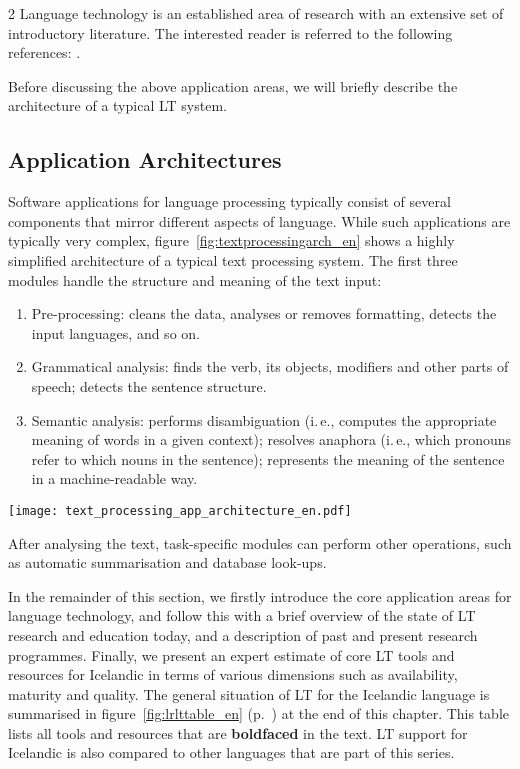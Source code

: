 \begin{multicols}{2}
Language technology is an established area of research with an extensive set of introductory literature. The interested reader is referred to the following references: \cite{boo6, boo7, boo8, str37, boo9}.

Before discussing the above application areas, we will briefly describe the architecture of a typical LT system.

\subsection{Application Architectures}

Software applications for language processing typically consist of several components that mirror different aspects of language. While such applications are typically very complex, figure~\ref{fig:textprocessingarch_en} shows a highly simplified architecture of a typical text processing system. The first three modules handle the structure and meaning of the text input:

\begin{enumerate}
\item Pre-processing: cleans the data, analyses or removes formatting, detects the input languages, and so on.
\item Grammatical analysis: finds the verb, its objects, modifiers and other parts of speech; detects the sentence structure.
\item Semantic analysis: performs disambiguation (i.\,e., computes the appropriate meaning of words in a given context); resolves anaphora (i.\,e., which pronouns refer to which nouns in the sentence); represents the meaning of the sentence in a machine-readable way.
\end{enumerate}

\begin{figure*}[b]
  \center
  \texttt{[image: text\_processing\_app\_architecture\_en.pdf]}
  \caption{A typical text processing architecture}
  \label{fig:textprocessingarch_en}
\end{figure*}

After analysing the text, task-specific modules can perform other operations, such as automatic summarisation and database look-ups.

In the remainder of this section, we firstly introduce the core application areas for language technology, and follow this with a brief overview of the state of LT research and education today, and a description of past and present research programmes. Finally, we present an expert estimate of core LT tools and resources for Icelandic in terms of various dimensions such as availability, maturity and quality. The general situation of LT for the Icelandic language is summarised in figure~\ref{fig:lrlttable_en} (p.~\pageref{fig:lrlttable_en}) at the end of this chapter. This table lists all tools and resources that are \textbf{boldfaced} in the text. LT support for Icelandic is also compared to other languages that are part of this series.


\end{multicols}
